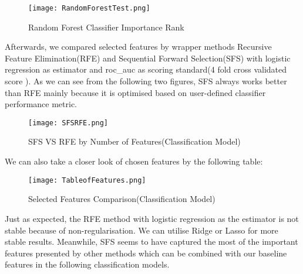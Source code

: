\begin{figure}[H]
  \centering
  \texttt{[image: RandomForestTest.png]}
  \caption{Random Forest Classifier Importance Rank}
\end{figure}
Afterwards, we compared selected features by wrapper methods Recursive Feature Elimination(RFE) and Sequential Forward Selection(SFS) with logistic regression as estimator and roc\_auc as scoring standard(4 fold cross validated score ). As we can see from the following two figures, SFS always works better than RFE mainly because it is optimised based on user-defined classifier performance metric. 
\begin{figure}[H]
  \centering
  \texttt{[image: SFSRFE.png]}
  \caption{SFS VS RFE by Number of Features(Classification Model)}
\end{figure}
We can also take a closer look of chosen features by the following table:
\begin{figure}[H]
  \centering
  \texttt{[image: TableofFeatures.png]}
  \caption{Selected Features Comparison(Classification Model)}
\end{figure}
Just as expected, the RFE method with logistic regression as the estimator is not stable because of non-regularisation. We can utilise Ridge or Lasso for more stable results. Meanwhile, SFS seems to have captured the most of the important features presented by other methods which can be combined with our baseline features in the following classification models.
